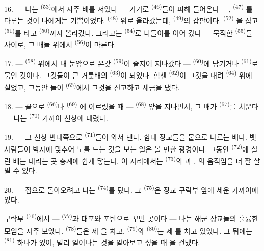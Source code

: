 \VUsaut{3.0mm}
\VUsaut{3.0mm}

16. --- 나는  \textsuperscript{(53)}에서 자주 배를 저었다 — 거기로
 \textsuperscript{(46)}들이 피해 들어온다 —,  \textsuperscript{(47)}
를 다루는 것이 나에게는 기쁨이었다.  \textsuperscript{(48)} 위로 올라갔는데,
 \textsuperscript{(49)}의 갑판이다.  \textsuperscript{(52)}
을 잡고  \textsuperscript{(51)}를 타고  \textsuperscript{(50)}까지
올라갔다. 그러고는  \textsuperscript{(54)}로 나들이를 이어 갔다 — 묵직한
 \textsuperscript{(55)}들 사이로, 그 배들 위에서 
\textsuperscript{(56)}이 마른다.

17. ---  \textsuperscript{(58)} 위에서 내 눈앞으로 온갖 
\textsuperscript{(59)}이 줄지어 지나갔다 —  \textsuperscript{(60)}에 담기거나
 \textsuperscript{(61)}로 묶인 것이다. 그것들이 큰 거룻배의 
\textsuperscript{(63)}이 되었다. 힘센  \textsuperscript{(62)}이 그것을 내려
 \textsuperscript{(64)} 위에 실었고, 그동안 들이
 \textsuperscript{(65)}에서 그것을 신고하고 세금을 냈다.

18. --- 끝으로  \textsuperscript{(66)}나  \textsuperscript{(69)}
에 이르렀을 때 —  \textsuperscript{(68)} 앞을 지나면서, 그 배가
 \textsuperscript{(67)}를 치운다 — 나는  \textsuperscript{(70)}
가까이 선창에 내렸다.

19. --- 그 선창 반대쪽으로  \textsuperscript{(71)}들이 와서 댄다. 함대
장교들을 뭍으로 나르는 배다. 뱃사람들이 박자에 맞추어 노를 드는 것을 보는 일은 볼 만한
광경이다. 그동안  \textsuperscript{(72)}에 실린 배는 내리는 곳 층계에 쉽게
닿는다. 이 자리에서는  \textsuperscript{(73)}의 과
, 의 움직임을 더 잘 살필 수 있다.

\VUsaut{3.0mm}
\VUsaut{3.0mm}

20. --- 집으로 돌아오려고 나는  \textsuperscript{(74)}를 탔다. 그
 \textsuperscript{(75)}은 장교 구락부 앞에 세운  가까이에 있다.

구락부  \textsuperscript{(76)}에서 —  \textsuperscript{(77)}과
대포와 포탄으로 꾸민 곳이다 — 나는 해군 장교들의 훌륭한 모임을 자주 보았다.
 \textsuperscript{(78)}들은 제 을 차고, 
\textsuperscript{(79)}와  \textsuperscript{(80)}는 제 를
차고 있었다. 그 뒤에는  \textsuperscript{(81)} 하나가 있어, 멀리 일어나는 것을
알아보고 싶을 때 을 건넸다.

